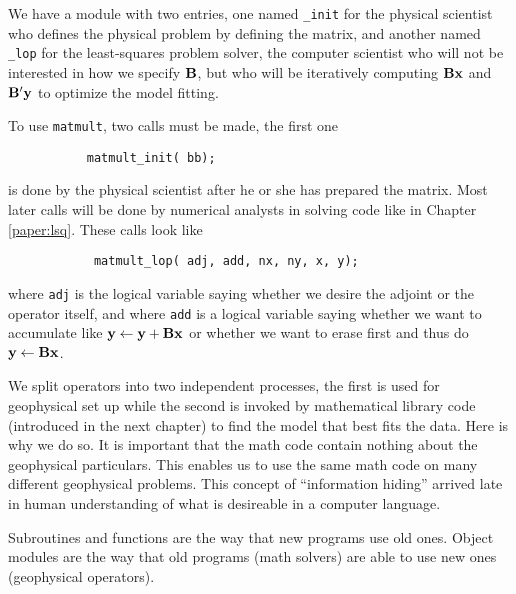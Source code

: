 We have a module with two entries,
one named {\tt \_init} 
for the physical scientist who defines the physical problem by
defining the matrix, and
another named {\tt \_lop} 
for the least-squares problem solver,
the computer scientist who will not be interested
in how we specify $\bold B$, but who will be iteratively computing
$\bold B\bold x$ and $\bold B' \bold y$
to optimize the model fitting.
\begin{comment}
The lines beginning with {\tt {\#}{\%}} are expanded by Loptran into
more verbose and distracting Fortran 90 code.
The second line in the module \texttt{matmult},
however,
is pure Fortran syntax saying that
{\tt bb} is a pointer to a real-valued matrix.
\end{comment}
\par
To use \texttt{matmult}, two calls must be made,
the first one
\begin{verbatim}
           matmult_init( bb);
\end{verbatim}
is done by the physical scientist after he or she has prepared the matrix.
Most later calls will be done by numerical analysts
in solving code like in Chapter \ref{paper:lsq}.
These calls look like
\begin{verbatim}
            matmult_lop( adj, add, nx, ny, x, y);
\end{verbatim}
where {\tt adj} is the logical variable saying whether we desire
the adjoint or the operator itself,
and where {\tt add} is a logical variable saying
whether we want to accumulate like
$\bold y \leftarrow \bold y+\bold B\bold x$
or whether we want to erase first and thus do
$\bold y \leftarrow \bold B\bold x$.
\begin{comment}
The return value {\tt stat} is an integer parameter,
mostly useless (unless you want to use it for error codes). 
\par
Operator initialization often allocates memory.
To release this memory, you can {\tt call matmult\_close()}
although in this case nothing really happens.
\end{comment}
\par
We split operators into two independent processes,
the first is used for geophysical set up
while the second is invoked by mathematical library code
(introduced in the next chapter)
to find the model that best fits the data.
Here is why we do so.
It is important that the math code contain nothing about
the geophysical particulars.  This enables us to use
the same math code on many different geophysical problems.
This concept of ``information hiding'' arrived late in
human understanding of what is desireable in a computer language.
\begin{comment}
This feature alone is valuable enough to warrant
upgrading from Fortran 77 to Fortran 90, and likewise from C to C++.
\end{comment}
Subroutines and functions are the way that new programs use old ones.
Object modules are the way that old programs (math solvers)
are able to use new ones (geophysical operators).


